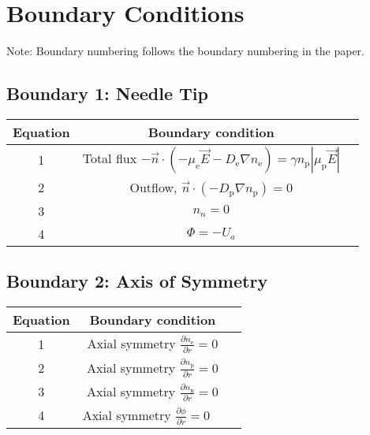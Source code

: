 \documentclass[12pt, a4paper]{report}
\begin{document}
\section{\bf \large Boundary Conditions}
Note: Boundary numbering follows the boundary numbering in the paper.

\subsection{Boundary 1: Needle Tip}

\begin{table}[!h]
    \centering\begin{tabular}{|c|c|c}
        \hline
        Equation & Boundary condition\\ \hline
        1 & Total flux $-\vec{n} \cdot\left(-\mu_{\mathrm{e}} \vec{E} -D_{\mathrm{e}} \nabla n_{\mathrm{e}}\right) =\gamma n_{\mathrm{p}}|\mu_{\mathrm{p}} \vec{E}|$ \\ \hline
        2 & Outflow, $\vec{n} \cdot\left(-D_{\mathrm{p}} \nabla n_{\mathrm{p}}\right)=0$  \\ \hline
        3 & $n_n=0$ \\ \hline
        4 & $\Phi=-U_a$ \\ \hline

    \end{tabular}
\end{table}
\clearpage

\subsection{Boundary 2: Axis of Symmetry}
\begin{table}[!h]
    \centering\begin{tabular}{|c|c|c}
        \hline
        Equation & Boundary condition\\ \hline
        1 & Axial symmetry $\frac{\partial n_{\mathrm{e}}}{\partial r}=0$ \\ \hline
        2 & Axial symmetry $\frac{\partial n_{\mathrm{p}}}{\partial r}=0$  \\ \hline
        3 & Axial symmetry $\frac{\partial n_{\mathrm{n}}}{\partial r}=0$ \\ \hline
        4 & Axial symmetry $\frac{\partial \phi}{\partial r}=0 \quad$ \\ \hline

    \end{tabular}
\end{table}
\end{document}
